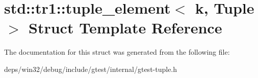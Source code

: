 \hypertarget{structstd_1_1tr1_1_1tuple__element}{}\section{std\+:\+:tr1\+:\+:tuple\+\_\+element$<$ k, Tuple $>$ Struct Template Reference}
\label{structstd_1_1tr1_1_1tuple__element}


The documentation for this struct was generated from the following file\+:\begin{DoxyCompactItemize}
\item 
deps/win32/debug/include/gtest/internal/gtest-\/tuple.\+h\end{DoxyCompactItemize}
